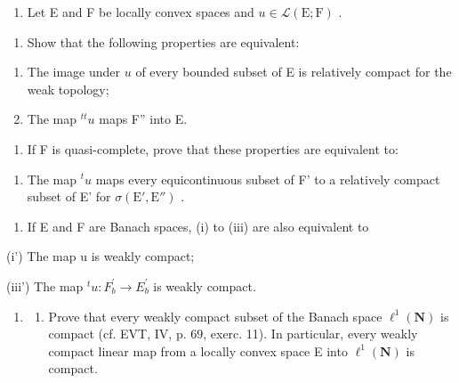 \begin{enumerate}
\def\labelenumi{\arabic{enumi})}
\setcounter{enumi}{27}
\tightlist
\item
  Let E and F be locally convex spaces and \(u \in \mathcal{L}(\mathrm{E};\mathrm{F})\) .
\end{enumerate}

\begin{enumerate}
\def\labelenumi{\alph{enumi})}
\tightlist
\item
  Show that the following properties are equivalent:
\end{enumerate}

\begin{enumerate}
\def\labelenumi{(\roman{enumi})}
\item
  The image under \(u\) of every bounded subset of E is relatively compact for the weak topology;
\item
  The map \(^{tt}u\) maps F'' into E.
\end{enumerate}

\begin{enumerate}
\def\labelenumi{\alph{enumi})}
\setcounter{enumi}{1}
\tightlist
\item
  If F is quasi-complete, prove that these properties are equivalent to:
\end{enumerate}

\begin{enumerate}
\def\labelenumi{(\roman{enumi})}
\setcounter{enumi}{2}
\tightlist
\item
  The map \(^{t}u\) maps every equicontinuous subset of F' to a relatively compact subset of E' for \(\sigma(\mathrm{E}',\mathrm{E}'')\) .
\end{enumerate}

\begin{enumerate}
\def\labelenumi{\alph{enumi})}
\setcounter{enumi}{2}
\tightlist
\item
  If E and F are Banach spaces, (i) to (iii) are also equivalent to
\end{enumerate}

(i') The map u is weakly compact;

(iii') The map \(^{t}u\colon F_{b}^{\prime}\to E_{b}^{\prime}\) is weakly compact.

\begin{enumerate}
\def\labelenumi{\arabic{enumi})}
\setcounter{enumi}{28}
\tightlist
\item
  \begin{enumerate}
  \def\labelenumii{\alph{enumii})}
  \tightlist
  \item
    Prove that every weakly compact subset of the Banach space \(\ell^{1}(\mathbf{N})\) is compact (cf. EVT, IV, p. 69, exerc. 11). In particular, every weakly compact linear map from a locally convex space E into \(\ell^{1}(\mathbf{N})\) is compact.
  \end{enumerate}
\end{enumerate}

